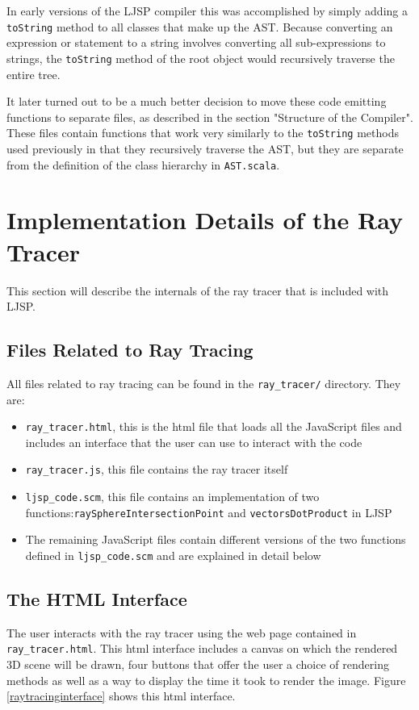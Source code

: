 \documentclass[11pt]{report}
\begin{document}
In early versions of the LJSP compiler this was accomplished by simply adding a \texttt{toString} method to all classes that make up the AST. Because converting an expression or statement to a string involves converting all sub-expressions to strings, the \texttt{toString} method of the root object would recursively traverse the entire tree.

It later turned out to be a much better decision to move these code emitting functions to separate files, as described in the section "Structure of the Compiler". These files contain functions that work very similarly to the \texttt{toString} methods used previously in that they recursively traverse the AST, but they are separate from the definition of the class hierarchy in \texttt{AST.scala}.

\section{Implementation Details of the Ray Tracer}
This section will describe the internals of the ray tracer that is included with LJSP.

\subsection{Files Related to Ray Tracing}
All files related to ray tracing can be found in the \texttt{ray_tracer/} directory. They are:
\begin{itemize}
\item \texttt{ray_tracer.html}, this is the html file that loads all the JavaScript files and includes an interface that the user can use to interact with the code
\item \texttt{ray_tracer.js}, this file contains the ray tracer itself
\item \texttt{ljsp_code.scm}, this file contains an implementation of two functions:\texttt{raySphereIntersectionPoint} and \texttt{vectorsDotProduct} in LJSP
\item The remaining JavaScript files contain different versions of the two functions defined in \texttt{ljsp_code.scm} and are explained in detail below
\end{itemize}


\subsection{The HTML Interface}
The user interacts with the ray tracer using the web page contained in \texttt{ray_tracer.html}. This html interface includes a canvas on which the rendered 3D scene will be drawn, four buttons that offer the user a choice of rendering methods as well as a way to display the time it took to render the image. Figure \ref{raytracinginterface} shows this html interface.
\end{document}
